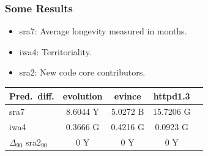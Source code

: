\documentclass{beamer}
\begin{document}
\begin{frame}
\frametitle{Some Results}
\begin{center}
\begin{itemize}
\item sra7: Average longevity measured in months.
\item iwa4: Territoriality.
\item sra2: New code core contributors.\\
\end{itemize}

\vspace{0.5cm}

\begin{tabular}{l*{4}{c}}
Pred.\ diff.  & evolution & evince & httpd1.3\\
\hline\noalign{\smallskip}

sra7 &  8.6044 Y   & 5.0272 B   & 15.7206 G\\
\hline\noalign{\smallskip}
iwa4 &  0.3666 G   & 0.4216 G   & 0.0923 G\\
\hline\noalign{\smallskip}
$\Delta_{90}$ sra2$_{90}$   & 0 Y & 0 Y & 0 Y\\




\end{tabular}
\end{center}
\end{frame}
\end{document}
